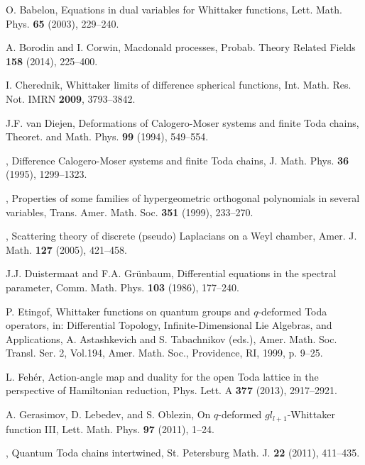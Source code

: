 \documentclass[reqno]{amsart}
\theoremstyle{remark}
\numberwithin{equation}{section}
\begin{document}

\begin{thebibliography}{000000}

 O. Babelon,
Equations in dual variables for Whittaker functions,
Lett. Math. Phys. {\bf 65} (2003), 229--240. 

 A. Borodin and I. Corwin, Macdonald processes, Probab. Theory Related Fields {\bf 158} (2014), 225--400.

 I. Cherednik, Whittaker limits of difference spherical functions,
Int. Math. Res. Not. IMRN {\bf 2009}, 3793--3842. 

 J.F. van Diejen,
Deformations of Calogero-Moser systems and finite Toda chains, Theoret. and Math. Phys. {\bf 99} (1994),
549--554.

 \bysame, Difference Calogero-Moser systems and finite Toda chains,
J. Math. Phys. {\bf 36} (1995), 1299--1323.

 \bysame,
Properties of some families of hypergeometric orthogonal polynomials in several variables, Trans. Amer. Math. Soc. {\bf 351} (1999), 233--270.

 \bysame, Scattering theory of discrete (pseudo) Laplacians on a Weyl chamber,
Amer. J. Math. {\bf 127} (2005), 421--458.

 J.J. Duistermaat and F.A. Gr\"unbaum,
Differential equations in the spectral parameter,
Comm. Math. Phys. {\bf 103} (1986), 177--240. 

 P. Etingof, 
Whittaker functions on quantum groups and $q$-deformed Toda operators, in: Differential Topology, Infinite-Dimensional Lie Algebras, and Applications, A. Astashkevich and S. Tabachnikov (eds.),
Amer. Math. Soc. Transl. Ser. 2, Vol.194, Amer. Math. Soc., Providence, RI, 1999, p. 9--25.

 L. Feh\'er,
Action-angle map and duality for the open Toda lattice in the perspective of Hamiltonian reduction,
Phys. Lett. A {\bf 377} (2013), 2917--2921. 

 A. Gerasimov, D. Lebedev, and S. Oblezin, On $q$-deformed $gl_{l+1}$-Whittaker function III,
Lett. Math. Phys. {\bf 97} (2011), 1--24. 

  \bysame, 
Quantum Toda chains intertwined, St. Petersburg Math. J. {\bf  22} (2011), 411--435.


\end{thebibliography}
\end{document}
